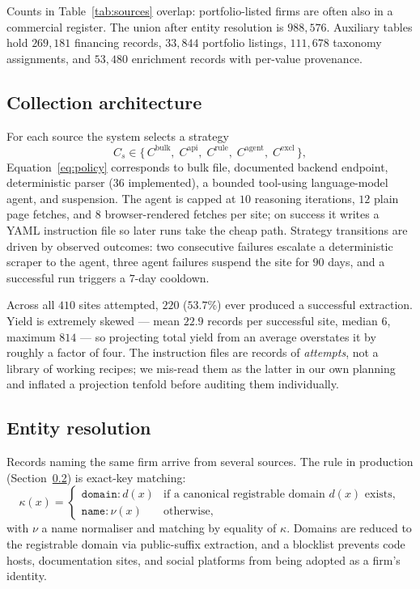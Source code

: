 \documentclass[11pt]{article}
\begin{document}
Counts in Table~\ref{tab:sources} overlap: portfolio-listed firms are often
also in a commercial register. The union after entity resolution is
$988{,}576$. Auxiliary tables hold $269{,}181$ financing records,
$33{,}844$ portfolio listings, $111{,}678$ taxonomy assignments, and $53{,}480$
enrichment records with per-value provenance.

\subsection{Collection architecture}

For each source the system selects a strategy
\begin{equation}
\label{eq:policy}
C_s \in \{\,C^{\text{bulk}},\; C^{\text{api}},\; C^{\text{rule}},\;
C^{\text{agent}},\; C^{\text{excl}}\,\},
\end{equation}
Equation~\eqref{eq:policy} corresponds to bulk file, documented backend endpoint, deterministic parser
($36$ implemented), a bounded tool-using language-model agent, and suspension.
The agent is capped at $10$ reasoning iterations, $12$ plain page fetches, and
$8$ browser-rendered fetches per site; on success it writes a YAML instruction
file so later runs take the cheap path. Strategy transitions are driven by
observed outcomes: two consecutive failures escalate a deterministic scraper to
the agent, three agent failures suspend the site for $90$ days, and a
successful run triggers a $7$-day cooldown.

Across all $410$ sites attempted, $220$ ($53.7\%$) ever produced a successful
extraction. Yield is extremely skewed --- mean $22.9$ records per successful
site, median $6$, maximum $814$ --- so projecting total yield from an average
overstates it by roughly a factor of four. The instruction files are records of
\emph{attempts}, not a library of working recipes; we mis-read them as the
latter in our own planning and inflated a projection tenfold before auditing
them individually.

\subsection{Entity resolution}
\label{sec:er}

Records naming the same firm arrive from several sources. The rule in production (Section~\ref{sec:er}) is exact-key matching:
\begin{equation}
\label{eq:key}
\kappa(x) =
\begin{cases}
\texttt{domain:}\,d(x) & \text{if a canonical registrable domain } d(x)\text{ exists},\\[2pt]
\texttt{name:}\,\nu(x) & \text{otherwise},
\end{cases}
\end{equation}
with $\nu$ a name normaliser and matching by equality of $\kappa$. Domains are
reduced to the registrable domain via public-suffix extraction, and a blocklist
prevents code hosts, documentation sites, and social platforms from being
adopted as a firm's identity.
\end{document}
